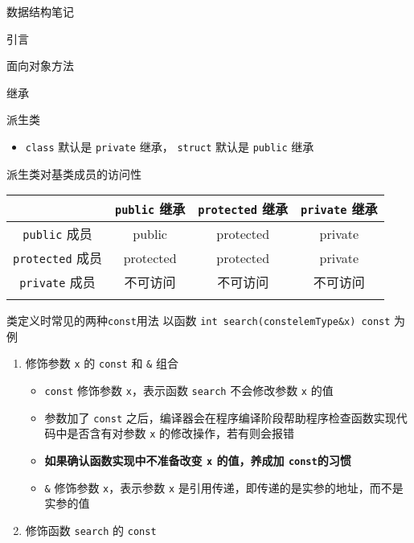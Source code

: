 \documentclass[
  ignorenonframetext,
]{beamer}
\providecommand{\tightlist}{%
  \setlength{\itemsep}{0pt}\setlength{\parskip}{0pt}}
\begin{document}
\begin{frame}[fragile]{数据结构笔记}
\begin{block}{引言}
\begin{block}{面向对象方法}
\begin{block}{继承}
\begin{block}{派生类}
\begin{itemize}
  \begin{itemize}
  \tightlist
  \item
    公有派生：\texttt{public}
  \item
    私有派生：\texttt{protected}
  \item
    保护派生：\texttt{private}
  \end{itemize}
\item
  \texttt{class} 默认是 \texttt{private} 继承， \texttt{struct} 默认是
  \texttt{public} 继承
\end{itemize}

\begin{block}{派生类对基类成员的访问性}
\protect{}\label{ux6d3eux751fux7c7bux5bf9ux57faux7c7bux6210ux5458ux7684ux8bbfux95eeux6027}
\begin{longtable}[]{@{}cccc@{}}
\toprule\noalign{}
& \texttt{public} 继承 & \texttt{protected} 继承 & \texttt{private}
继承 \\
\midrule\noalign{}
\endhead
\texttt{public} 成员 & public & protected & private \\
\texttt{protected} 成员 & protected & protected & private \\
\texttt{private} 成员 & 不可访问 & 不可访问 & 不可访问 \\
\bottomrule\noalign{}
\end{longtable}
\end{block}
\end{block}
\end{block}

\begin{block}{类定义时常见的两种\texttt{const}用法}
\protect{}\label{ux7c7bux5b9aux4e49ux65f6ux5e38ux89c1ux7684ux4e24ux79cdconstux7528ux6cd5}
以函数 \texttt{int\ search(constelemType\&x)\ const} 为例

\begin{enumerate}
\tightlist
\item
  修饰参数 \texttt{x} 的 \texttt{const} 和 \texttt{\&} 组合

  \begin{itemize}
  \tightlist
  \item
    \texttt{const} 修饰参数 \texttt{x}，表示函数 \texttt{search}
    不会修改参数 \texttt{x} 的值
  \item
    参数加了 \texttt{const}
    之后，编译器会在程序编译阶段帮助程序检查函数实现代码中是否含有对参数
    \texttt{x} 的修改操作，若有则会报错
  \item
    \textbf{如果确认函数实现中不准备改变 \texttt{x} 的值，养成加
    \texttt{const}的习惯}
  \item
    \texttt{\&} 修饰参数 \texttt{x}，表示参数 \texttt{x}
    是引用传递，即传递的是实参的地址，而不是实参的值
  \end{itemize}
\item
  修饰函数 \texttt{search} 的 \texttt{const}


\end{enumerate}
\end{block}
\end{block}
\end{block}
\end{frame}
\end{document}
